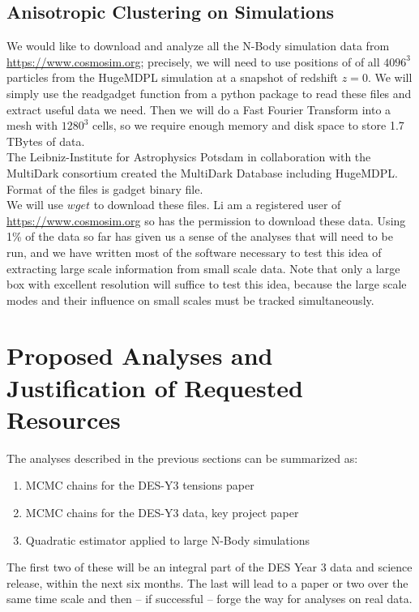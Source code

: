 \documentclass[12pt]{article}
\begin{document}
\begin{small}

\subsection{Anisotropic Clustering on Simulations}
We would like to download and analyze all the N-Body simulation data from \url{https://www.cosmosim.org}; precisely, we will need to use positions of of all $4096^3$ particles from the HugeMDPL simulation at a snapshot of redshift $z=0$. 
We will simply use the readgadget function from a python package to read these files and extract useful data we need. Then we will do a Fast Fourier Transform into a mesh with $1280^3$ cells, so we require enough memory and disk space to store 1.7 TBytes of data.\\
The Leibniz-Institute for Astrophysics Potsdam in collaboration with the MultiDark consortium created the MultiDark Database including HugeMDPL. Format of the files is gadget binary file. \\
We will use $wget$ to download these files. Li am a registered user of \url{https://www.cosmosim.org} so has the permission to download these data. Using 1\% of the data so far has given us a sense of the analyses that will need to be run, and we have written most of the software necessary to test this idea of extracting large scale information from small scale data. Note that only a large box with excellent resolution will suffice to test this idea, because the large scale modes and their influence on small scales must be tracked simultaneously.%


\section{Proposed Analyses and Justification of Requested Resources}

The analyses described in the previous sections can be summarized as:
\begin{enumerate}
\item MCMC chains for the DES-Y3 tensions paper
\item MCMC chains for the DES-Y3 data, key project paper
\item Quadratic estimator applied to large N-Body simulations
\end{enumerate}
The first two of these will be an integral part of the DES Year 3 data and science release, within the next six months. The last will lead to a paper or two over the same time scale and then -- if successful -- forge the way for analyses on real data.


\end{small}
\end{document}
